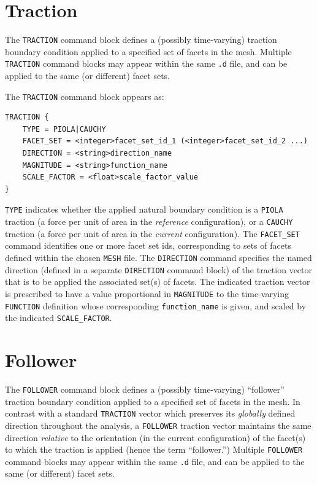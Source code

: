 \documentclass[11pt]{article} %
\begin{document}
\section{Traction} \label{traction_section} The \texttt{TRACTION} command block defines a (possibly time-varying) traction boundary condition applied to a specified set of facets in the mesh. Multiple \texttt{TRACTION} command blocks may appear within the same \texttt{.d} file, and can be applied to the same (or different) facet sets.

The \texttt{TRACTION} command block appears as:
\begin{lstlisting}
TRACTION {
	TYPE = PIOLA|CAUCHY
	FACET_SET = <integer>facet_set_id_1 (<integer>facet_set_id_2 ...)
	DIRECTION = <string>direction_name
	MAGNITUDE = <string>function_name
	SCALE_FACTOR = <float>scale_factor_value
}
\end{lstlisting}
\texttt{TYPE} indicates whether the applied natural boundary condition is a \texttt{PIOLA} traction (a force per unit of area in the \textit{reference} configuration), or a \texttt{CAUCHY} traction (a force per unit of area in the \textit{current} configuration). The \texttt{FACET\_SET} command identifies one or more facet set ids, corresponding to sets of facets defined within the chosen \texttt{MESH} file. The \texttt{DIRECTION} command specifies the named direction (defined in a separate \texttt{DIRECTION} command block) of the traction vector that is to be applied the associated set(s) of facets. The indicated traction vector is prescribed to have a value proportional in \texttt{MAGNITUDE} to the time-varying \texttt{FUNCTION} definition whose corresponding \texttt{function\_name} is given, and scaled by the indicated \texttt{SCALE\_FACTOR}.

\section{Follower} \label{follower_section} The \texttt{FOLLOWER} command block defines a (possibly time-varying) ``follower'' traction boundary condition applied to a specified set of facets in the mesh. In contrast with a standard \texttt{TRACTION} vector which preserves its \textit{globally} defined direction throughout the analysis, a \texttt{FOLLOWER} traction vector maintains the same direction \textit{relative} to the orientation (in the current configuration) of the facet(s) to which the traction is applied (hence the term ``follower.'') Multiple \texttt{FOLLOWER} command blocks may appear within the same \texttt{.d} file, and can be applied to the same (or different) facet sets.
\end{document}
